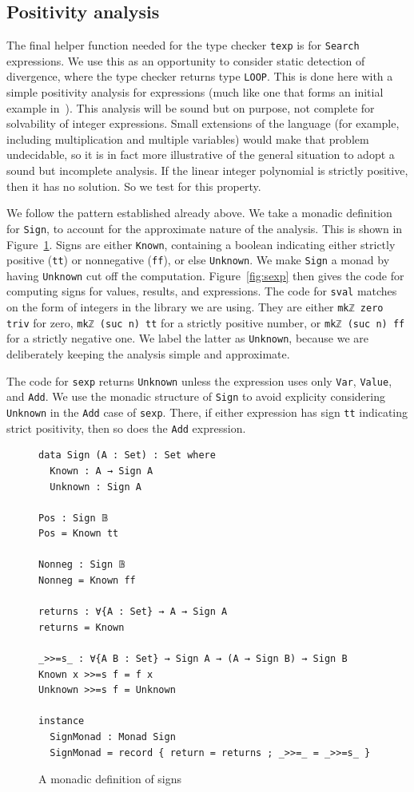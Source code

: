 \documentclass[acmsmall,screen,review]{acmart}
\begin{document}
\subsection{Positivity analysis}
\label{sec:pos}

The final helper function needed for the type checker \verb|texp| is
for \verb|Search| expressions.  We use this as an opportunity to
consider static detection of divergence, where the type checker
returns type \verb|LOOP|.  This is done here with a simple positivity
analysis for expressions (much like one that forms an initial example
in~\citet{garby+25}).  This analysis will be sound but on purpose, not
complete for solvability of integer expressions.  Small extensions of
the language (for example, including multiplication and multiple
variables) would make that problem undecidable, so it is in fact more
illustrative of the general situation to adopt a sound but incomplete
analysis.  If the linear integer polynomial is strictly positive,
then it has no solution.  So we test for this property.

We follow the pattern established already above.  We take a monadic
definition for \verb|Sign|, to account for the approximate nature of the
analysis.  This is shown in Figure~\ref{fig:sign}.  Signs are either
\verb|Known|, containing a boolean indicating either strictly positive
(\verb|tt|) or nonnegative (\verb|ff|), or else \verb|Unknown|.  We
make \verb|Sign| a monad by having \verb|Unknown| cut off the
computation.  Figure~\ref{fig:sexp} then gives the code for computing
signs for values, results, and expressions.  The code for \verb|sval|
matches on the form of integers in the library we are using.  They are
either \verb|mkℤ zero triv| for zero, \verb|mkℤ (suc n) tt| for a
strictly positive number, or \verb|mkℤ (suc n) ff| for a strictly
negative one.  We label the latter as \verb|Unknown|, because we
are deliberately keeping the analysis simple and approximate.

The code for \verb|sexp| returns \verb|Unknown| unless the expression
uses only \verb|Var|, \verb|Value|, and \verb|Add|.  We use the
monadic structure of \verb|Sign| to avoid explicity considering
\verb|Unknown| in the \verb|Add| case of \verb|sexp|.  There, if
either expression has sign \verb|tt| indicating strict positivity,
then so does the \verb|Add| expression.

\begin{figure}
\begin{verbatim}
data Sign (A : Set) : Set where
  Known : A → Sign A
  Unknown : Sign A

Pos : Sign 𝔹
Pos = Known tt

Nonneg : Sign 𝔹
Nonneg = Known ff

returns : ∀{A : Set} → A → Sign A
returns = Known

_>>=s_ : ∀{A B : Set} → Sign A → (A → Sign B) → Sign B
Known x >>=s f = f x
Unknown >>=s f = Unknown

instance
  SignMonad : Monad Sign 
  SignMonad = record { return = returns ; _>>=_ = _>>=s_ }
\end{verbatim}
\caption{A monadic definition of signs}
\label{fig:sign}
\end{figure}
 
\end{document}
